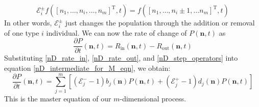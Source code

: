 \begin{equation}
\label{nD_step_operators}
\mathcal{E}_{i}^{\pm}f([n_1,\ldots,n_i,\ldots,n_m]^{\mathrm{T}},t) = f([n_1,\ldots,n_i \pm 1, \ldots n_m]^{\mathrm{T}},t)
\end{equation}
In other words, $\mathcal{E}_{i}^{\pm}$ just changes the population through the addition or removal of one type $i$ individual. We can now the rate of change of $P(\mathbf{n},t)$ as
\begin{equation}
\label{nD_intermediate_for_M_eqn}
\frac{\partial P}{\partial t}(\mathbf{n},t) = R_{\textrm{in}}(\mathbf{n},t) - R_{\textrm{out}}(\mathbf{n},t)
\end{equation}
Substituting \eqref{nD_rate_in}, \eqref{nD_rate_out}, and \eqref{nD_step_operators} into equation \eqref{nD_intermediate_for_M_eqn}, we obtain:
\begin{equation}
\label{nD_M_eqn}
\frac{\partial P}{\partial t}(\mathbf{n},t) = \sum\limits_{j=1}^{m}\left[(\mathcal{E}_j^{-}-1)b_j(\mathbf{n})P(\mathbf{n},t) + (\mathcal{E}_j^{+}-1)d_j(\mathbf{n})P(\mathbf{n},t)\right]
\end{equation}
This is the master equation of our $m$-dimensional process.

